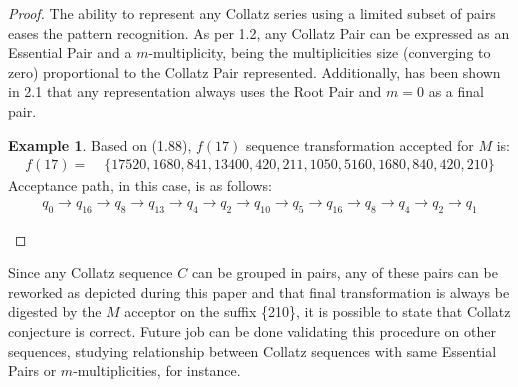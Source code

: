 \documentclass{jams-l}
\theoremstyle{definition}
\newtheorem{example}[theorem]{Example}
\theoremstyle{remark}
\numberwithin{equation}{section}
\begin{document}
\begin{proof}
\begin{minipage}[b]{.45\textwidth}
			\end{minipage}
			The ability to represent any Collatz series using a limited subset of pairs eases the pattern recognition. As per 1.2, any Collatz Pair can be expressed as an Essential Pair and a $m$-multiplicity, being the multiplicities size (converging to zero) proportional to the Collatz Pair represented. Additionally, has been shown in 2.1 that any representation always uses the Root Pair and $m = 0$ as a final pair.
		\begin{example}
			Based on (1.88), $f(17)$ sequence transformation accepted for $M$ is:
				\begin{align}
					f(17)= &\;\{17520,1680,841,13400,420,211,1050,5160,1680,840,420,210\}
				\end{align}
			Acceptance path, in this case, is as follows:
			\begin{align*}
				q_{0} \rightarrow q_{16} \rightarrow q_{8} \rightarrow q_{13} \rightarrow q_{4} \rightarrow q_{2} \rightarrow q_{10} \rightarrow q_{5} \rightarrow 
				q_{16} \rightarrow q_{8} \rightarrow q_{4} \rightarrow q_{2} \rightarrow q_{1}
			\end{align*}
		\end{example}
    \end{proof}
    Since any Collatz sequence $C$ can be grouped in pairs, any of these pairs can be reworked as depicted during this paper and that final transformation is always be digested by the $M$ acceptor on the suffix \{210\}, it is possible to state that Collatz conjecture is correct.
    Future job can be done validating this procedure on other sequences, studying relationship between Collatz sequences with same Essential Pairs or $m$-multiplicities, for instance.

    \newpage
\end{document}
